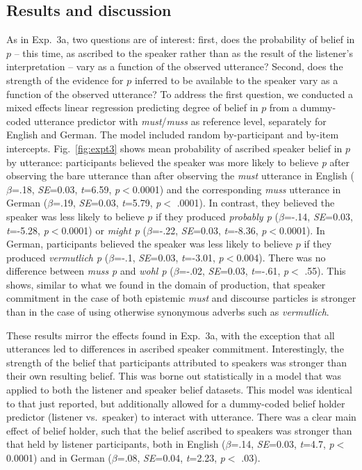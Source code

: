 \documentclass[11pt]{article}
\begin{document}
\subsection{Results and discussion}

As in Exp.~3a, two questions are of interest: first, does the probability of  belief in $p$ -- this time, as ascribed to the speaker rather than as the result of the listener's interpretation --  vary as a function of the observed utterance? Second, does the strength of the evidence for $p$ inferred to be available to the speaker vary as a function of the observed utterance? To address the first question, we conducted a mixed effects linear regression predicting degree of belief in $p$ from a dummy-coded utterance predictor with \emph{must}/\emph{muss} as reference level, separately for English and German. The model included random by-participant and by-item intercepts. Fig.~\ref{fig:expt3} shows mean probability of ascribed speaker belief in $p$ by utterance: participants believed the speaker was more likely to believe \emph{p}  after observing the bare utterance than after observing the \emph{must} utterance in English   ($\beta$=.18, \emph{SE}=0.03, \emph{t}=6.59, \emph{p}$<$0.0001) and the corresponding \emph{muss} utterance in German ($\beta$=.19, \emph{SE}=0.03, \emph{t}=5.79, \emph{p}$<$ .0001). In contrast, they believed the speaker was less likely to believe $p$ if they produced \emph{probably p} ($\beta$=-.14, \emph{SE}=0.03, \emph{t}=-5.28, \emph{p}$<$0.0001) or \emph{might p} ($\beta$=-.22, \emph{SE}=0.03, \emph{t}=-8.36, \emph{p}$<$0.0001). In German, participants believed the speaker was less likely to believe $p$ if they produced \emph{vermutlich p} ($\beta$=-.1, \emph{SE}=0.03, \emph{t}=-3.01, \emph{p}$<$0.004). There was no difference between \emph{muss p} and \emph{wohl p} ($\beta$=-.02, \emph{SE}=0.03, \emph{t}=-.61, \emph{p}$<$ .55).  This shows, similar to what we found in the domain of production, that speaker commitment in the case of both epistemic \emph{must} and discourse particles is stronger than in the case of using otherwise synonymous adverbs such as \emph{vermutlich}.

These results mirror the effects found in Exp.~3a, with the exception that all utterances led to differences in ascribed speaker commitment. Interestingly, the strength of the belief that participants attributed to speakers was stronger than their own resulting belief. This was borne out statistically in a model that was applied to both the listener and speaker belief datasets. This model was identical to that just reported, but additionally allowed for a dummy-coded belief holder predictor (listener vs.~speaker)  to interact with utterance. There was a clear main effect of belief holder, such that the belief ascribed to speakers was stronger than that held by listener participants, both in English ($\beta$=.14, \emph{SE}=0.03, \emph{t}=4.7, \emph{p}$<$0.0001) and in German ($\beta$=.08, \emph{SE}=0.04, \emph{t}=2.23, \emph{p}$<$ .03). 
\end{document}
